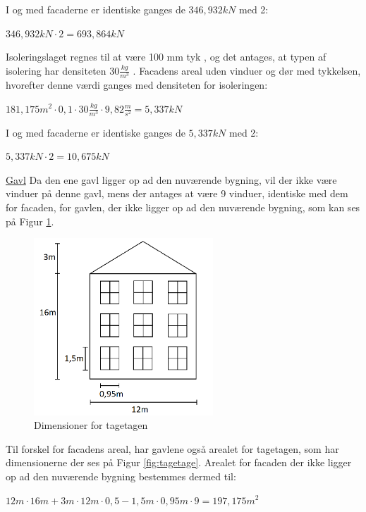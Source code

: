I og med facaderne er identiske ganges de $346,\!932 kN$ med 2:
\begin{center}
	$346,\!932 kN\cdot 2=693,\!864 kN$
\end{center}

Isoleringslaget regnes til at være 100 mm tyk \citep{isolering}, og det antages, at typen af isolering har densiteten $30 \frac{kg}{m^3}$ \citep{densitet}.
\newline \indent{     }  Facadens areal uden vinduer og dør med tykkelsen, hvorefter denne værdi ganges med densiteten for isoleringen:
\begin{center}
	$181,\!175 m^2\cdot 0,1 \cdot 30 \frac{kg}{m^3}\cdot 9,\!82 \frac{m}{s^2}=5,\!337 kN$
\end{center}

I og med facaderne er identiske ganges de $5,\!337 kN$ med 2:
\begin{center}
	$5,\!337 kN\cdot 2=10,\!675 kN$
\end{center}

\underline{Gavl}
\newline
Da den ene gavl ligger op ad den nuværende bygning, vil der ikke være vinduer på denne gavl, mens der antages at være 9 vinduer, identiske med dem for facaden, for gavlen, der ikke ligger op ad den nuværende bygning, som kan ses på Figur \ref{fig:gavl}.

\begin{figure}[htbp]
	\centering
	\includegraphics[width=0.6\textwidth]{billeder/facadevestellerost.png}
	\caption{Dimensioner for tagetagen}
	\label{fig:gavl}
\end{figure}

Til forskel for facadens areal, har gavlene også arealet for tagetagen, som har dimensionerne der ses på Figur \ref{fig:tagetage}. Arealet for facaden der ikke ligger op ad den nuværende bygning bestemmes dermed til:
\begin{center}
	$12 m\cdot 16 m + 3 m\cdot 12 m \cdot 0,\!5 - 1,\!5 m\cdot 0,\!95 m \cdot 9=197,\!175 m^2$
\end{center}

